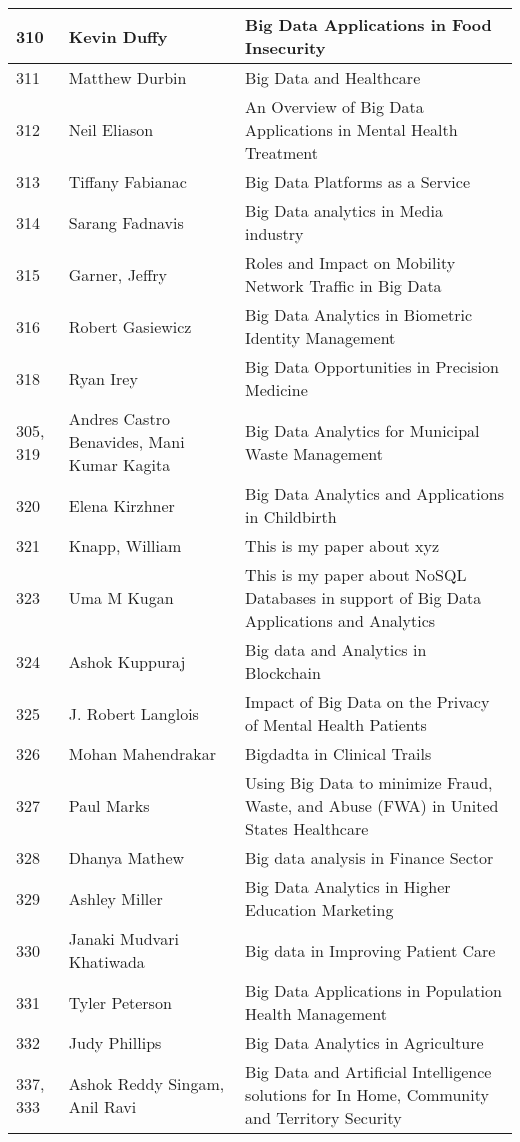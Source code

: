 \documentclass[12pt]{book}
\begin{document}
\begin{footnotesize}
\begin{longtable}{|p{1cm}p{5cm}p{9cm}|}
\hline
310 & Kevin Duffy & Big Data Applications in Food Insecurity  \\
\hline
311 & Matthew Durbin & Big Data and Healthcare  \\
\hline
312 & Neil Eliason & An Overview of Big Data Applications in Mental Health Treatment  \\
\hline
313 & Tiffany Fabianac & Big Data Platforms as a Service  \\
\hline
314 & Sarang Fadnavis & Big Data analytics in Media industry  \\
\hline
315 & Garner, Jeffry & Roles and Impact on Mobility Network Traffic in Big Data  \\
\hline
316 & Robert Gasiewicz & Big Data Analytics in Biometric Identity Management  \\
\hline
318 & Ryan Irey & Big Data Opportunities in Precision Medicine  \\
\hline
305, 319 & Andres Castro Benavides, Mani Kumar Kagita & Big Data Analytics for Municipal Waste Management  \\
\hline
320 & Elena Kirzhner & Big Data Analytics and Applications in Childbirth  \\
\hline
321 & Knapp, William & This is my paper about xyz  \\
\hline
323 & Uma M Kugan & This is my paper about NoSQL Databases in support of Big Data Applications and Analytics  \\
\hline
324 & Ashok Kuppuraj & Big data and Analytics in Blockchain  \\
\hline
325 & J. Robert Langlois & Impact of Big Data on the Privacy of Mental Health Patients  \\
\hline
326 & Mohan Mahendrakar & Bigdadta in Clinical Trails  \\
\hline
327 & Paul Marks & Using Big Data to minimize Fraud, Waste, and Abuse (FWA) in United  States Healthcare
  \\
\hline
328 & Dhanya Mathew & Big data analysis in Finance Sector  \\
\hline
329 & Ashley Miller & Big Data Analytics in Higher Education Marketing  \\
\hline
330 & Janaki Mudvari Khatiwada & Big data in Improving Patient Care  \\
\hline
331 & Tyler Peterson & Big Data Applications in Population Health Management  \\
\hline
332 & Judy Phillips & Big Data Analytics in Agriculture  \\
\hline
337, 333 & Ashok Reddy Singam, Anil Ravi & Big Data and Artificial Intelligence solutions for In Home, Community and Territory Security  \\

\end{longtable}
\end{footnotesize}
\end{document}
